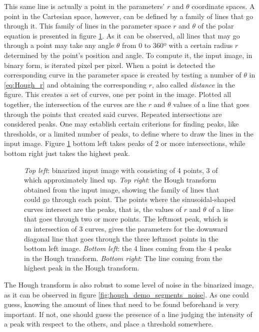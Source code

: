 \documentclass[../main.tex]{subfiles}
\begin{document}
This same line is actually a point in the parameters' $r$ and $\theta$ coordinate spaces. A point in the Cartesian space, however, can be defined by a family of lines that go through it. This family of lines in the parameter space $r$ and $\theta$ of the polar equation is presented in figure \ref{fig:hough_demo_points}. As it can be observed, all lines that may go through a point may take any angle $\theta$ from 0 to 360º with a certain radius $r$ determined by the point's position and angle. To compute it, the input image, in binary form, is iterated pixel per pixel. When a point is detected the corresponding curve in the parameter space is created by testing a number of $\theta$ in \ref{eq:Hough_r} and obtaining the corresponding $r$, also called \emph{distance} in the figure. This creates a set of curves, one per point in the image. Plotted all together, the intersection of the curves are the $r$ and $\theta$ values of a line that goes through the points that created said curves. Repeated intersections are considered peaks. One may establish certain criterions for finding peaks, like thresholds, or a limited number of peaks, to define where to draw the lines in the input image. Figure \ref{fig:hough_demo_points} bottom left takes peaks of 2 or more intersections, while bottom right just takes the highest peak. 

\begin{figure}[htbp]
    \centering
    \caption{\emph{Top left}: binarized input image with consisting of 4 points, 3 of which approximately lined up. \emph{Top right}: the Hough transform obtained from the input image, showing the family of lines that could go through each point. The points where the sinusoidal-shaped curves intersect are the peaks, that is, the values of $r$ and $\theta$ of a line that goes through two or more points. The leftmost peak, which is an intersection of 3 curves, gives the parameters for the downward diagonal line that goes through the three leftmost points in the bottom left image. \emph{Bottom left}: the 4 lines coming from the 4 peaks in the Hough transform. \emph{Bottom right}: The line coming from the highest peak in the Hough transform.}
    \label{fig:hough_demo_points}
\end{figure}

The Hough transform is also robust to some level of noise in the binarized image, as it can be observed in figure \ref{fig:hough_demo_segments_noise}. As one could guess, knowing the amount of lines that need to be found beforehand is very important. If not, one should guess the presence of a line judging the intensity of a peak with respect to the others, and place a threshold somewhere.
\end{document}
